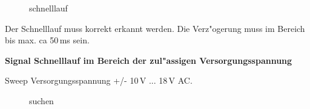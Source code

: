 \documentclass[ngerman,11pt,parskip=half] {scrartcl}
\newcommand {\tscopesize}{12cm}
\begin{document}
\begin{figure}[H]
\centering
{}
\caption{schnelllauf} \label{fig:1}
\end{figure}

Der Schnelllauf muss korrekt erkannt werden. Die Verz"ogerung muss im Bereich bis max. ca 50\,ms sein. 

\textbf{Signal Schnelllauf im Bereich der zul"assigen Versorgungsspannung}

Sweep Versorgungsspannung +/- 10\,V ... 18\,V AC. 

\begin{figure}[H]
\centering
{}
\caption{suchen} \label{fig:1}
\end{figure}
\end{document}
